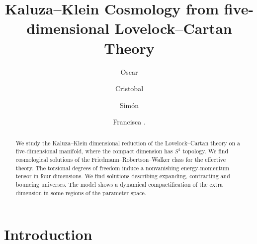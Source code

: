 \documentclass[aps,prd,12pt,superscriptaddress,showpacs,showkeys,longbibliography,reprint,nofootinbib]{revtex4-1}
\begin{document}
\title{Kaluza--Klein Cosmology from five-dimensional Lovelock--Cartan Theory}

\author{Oscar }

\author{Cristobal }

\author{Sim\'on }

\author{Francisca .}


\begin{abstract}
  We study the Kaluza--Klein dimensional reduction of the Lovelock--Cartan theory on a five-dimensional manifold, where the compact dimension has $S^1$ topology. We find cosmological solutions of the Friedmann--Robertson--Walker class for the effective theory. The torsional degrees of freedom induce a nonvanishing energy-momentum tensor in four dimensions. We find solutions describing expanding, contracting and bouncing universes. The model shows a dynamical compactification of the extra dimension in some regions of the parameter space. 
\end{abstract}



\maketitle

\section{Introduction}
\end{document}
